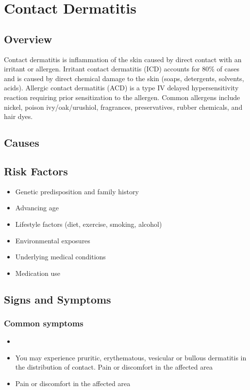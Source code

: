 \chapter{Contact Dermatitis}
\label{sec:Contact Dermatitis}

\section{Overview}
Contact dermatitis is inflammation of the skin caused by direct contact with an irritant or allergen. Irritant contact dermatitis (ICD) accounts for 80\% of cases and is caused by direct chemical damage to the skin (soaps, detergents, solvents, acids). Allergic contact dermatitis (ACD) is a type IV delayed hypersensitivity reaction requiring prior sensitization to the allergen. Common allergens include nickel, poison ivy/oak/urushiol, fragrances, preservatives, rubber chemicals, and hair dyes.
\section{Causes}
\section{Risk Factors}

\begin{itemize}[noitemsep]
  \item Genetic predisposition and family history
  \item Advancing age
  \item Lifestyle factors (diet, exercise, smoking, alcohol)
  \item Environmental exposures
  \item Underlying medical conditions
  \item Medication use
\end{itemize}
\section{Signs and Symptoms}

\subsection{Common symptoms}
\begin{itemize}[noitemsep]
  \item \item You may experience pruritic, erythematous, vesicular or bullous dermatitis in the distribution of contact. Pain or discomfort in the affected area    \item Pain or discomfort in the affected area
  \end{itemize}

